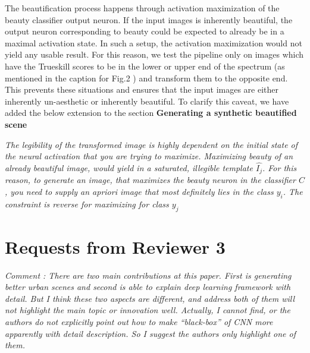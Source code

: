 \documentclass{paper}
\newenvironment{myquote}
{\definecolor{shadecolor}{rgb}{0.9,0.95,1} \begin{shaded*} \sf \em}
{\em\end{shaded*}}
\newenvironment{myquoteOrange}
{\definecolor{shadecolor}{rgb}{1,0.9,0.83} \begin{shaded*} \sf \em}
{\em\end{shaded*}}
\begin{document}
\noindent %
The beautification process happens through activation maximization of the beauty classifier output neuron. If the input images is inherently beautiful, the output neuron corresponding to beauty could be expected to already be in a maximal activation state. In such a setup, the activation maximization would not yield any usable result. For this reason, we test the pipeline only on images which have the Trueskill scores to be in the lower or upper end of the spectrum (as mentioned in the caption for Fig.2 ) and transform them to the opposite end. This prevents these situations and ensures that the input images are either inherently un-aesthetic or inherently beautiful. To clarify this caveat, we have added the below extension to the section \textbf{Generating a synthetic beautified scene}

\begin{myquoteOrange}
The legibility of the transformed image is highly dependent on the initial state of the neural activation that you are trying to maximize. Maximizing beauty of an already beautiful image, would yield in a saturated, illegible template $\hat{I_j}$. For this reason, to generate an image, that maximizes the beauty neuron in the classifier $C$ , you need to supply an apriori image that most definitely lies in the class $y_i$. The constraint is reverse for maximizing for class $y_j$
\end{myquoteOrange}


\section*{Requests from Reviewer 3}


\begin{myquote}
\noindent Comment : There are two main contributions at this paper. First is generating better urban scenes and second is able to explain deep learning framework with detail. But I think these two aspects are different, and address both of them will not highlight the main topic or innovation well. Actually, I cannot find, or the authors do not explicitly point out how to make “black-box” of CNN more apparently with detail description. So I suggest the authors only highlight one of them.
\end{myquote}
\end{document}
